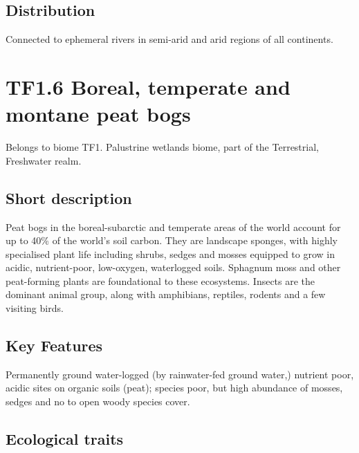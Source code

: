 \documentclass[
  letterpaper,
  DIV=11,
  numbers=noendperiod]{scrartcl}
\begin{document}
\subsection{Distribution}\label{distribution-107}

Connected to ephemeral rivers in semi-arid and arid regions of all
continents.

\section{TF1.6 Boreal, temperate and montane peat
bogs}\label{tf1.6-boreal-temperate-and-montane-peat-bogs}

Belongs to biome TF1. Palustrine wetlands biome, part of the
Terrestrial, Freshwater realm.

\subsection{Short description}\label{short-description-108}

Peat bogs in the boreal-subarctic and temperate areas of the world
account for up to 40\% of the world's soil carbon. They are landscape
sponges, with highly specialised plant life including shrubs, sedges and
mosses equipped to grow in acidic, nutrient-poor, low-oxygen,
waterlogged soils. Sphagnum moss and other peat-forming plants are
foundational to these ecosystems. Insects are the dominant animal group,
along with amphibians, reptiles, rodents and a few visiting birds.

\subsection{Key Features}\label{key-features-108}

Permanently ground water-logged (by rainwater-fed ground water,)
nutrient poor, acidic sites on organic soils (peat); species poor, but
high abundance of mosses, sedges and no to open woody species cover.

\subsection{Ecological traits}\label{ecological-traits-108}
\end{document}
